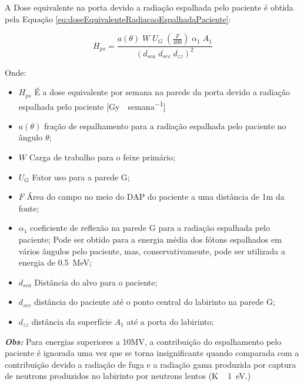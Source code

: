 \documentclass[11pt,a4paper]{article}
\begin{document}
            
            A Dose equivalente na porta devido a radiação espalhada pelo paciente é obtida pela Equação \ref{eq:doseEquivalenteRadiacaoEspalhadaPaciente}:

                \begin{equation}
                    H_{ps} = \frac{a(\theta) \; W \; U_G \; \left(\frac{F}{400}\right) \; \alpha_1 \; A_1}{\left(d_{sca} \; d_{sec} \; d_{zz}\right)^2}
                    \label{eq:doseEquivalenteRadiacaoEspalhadaPaciente}
                \end{equation}

            Onde:

                \begin{itemize}
                    \item $H_{ps}$ É a dose equivalente por semana na parede da porta devido a radiação espalhada pelo paciente [\unit{Gy \; semana^{-1}}]
                    \item $a(\theta)$   fração de espalhamento para a radiação espalhada pelo paciente no ângulo $\theta$;
                    \item $W$ Carga de trabalho para o feixe primário;
                    \item $U_G$ Fator uso para a parede G;
                    \item $F$ Área do campo no meio do DAP do paciente a uma distância de 1m da fonte;
                    \item $\alpha_1$ coeficiente de reflexão na parede G para a radiação espalhada pelo paciente; Pode ser obtido para a energia média dos fótons espalhados em vários ângulos pelo paciente, mas, conservativamente, pode ser utilizada a energia de \qty{0.5}{MeV};
                    \item $d_{sca}$ Distância do alvo para o paciente;
                    \item $d_{sec}$ distância do paciente até o ponto central do labirinto na parede G;
                    \item $d_{zz}$ distância da superfície $A_1$ até a porta do labirinto;
                \end{itemize} 
            
            \textbf{\textit{\textcolor{CarnationPink}{Obs:}}} Para energias superiores a 10MV, a contribuição do espalhamento pelo paciente é ignorada uma vez que se torna insignificante quando comparada com a contribuição devido a radiação de fuga e a radiação gama produzida por captura de neutrons produzidos no labirinto por neutrons lentos (K ~ \qty{1}{eV}.)
\end{document}
